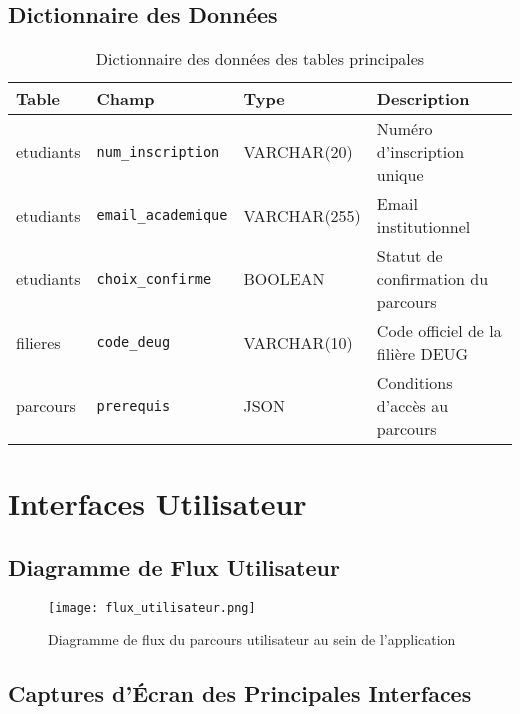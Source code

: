 \documentclass[12pt,a4paper]{report}
\begin{document}
\section{Dictionnaire des Données}
\begin{table}[h!]
    \centering
    \begin{tabular}{llll}
        \toprule
        \textbf{Table} & \textbf{Champ} & \textbf{Type} & \textbf{Description} \\
        \midrule
        etudiants & \texttt{num\_inscription} & VARCHAR(20) & Numéro d'inscription unique \\
        etudiants & \texttt{email\_academique} & VARCHAR(255) & Email institutionnel \\
        etudiants & \texttt{choix\_confirme} & BOOLEAN & Statut de confirmation du parcours \\
        filieres & \texttt{code\_deug} & VARCHAR(10) & Code officiel de la filière DEUG \\
        parcours & \texttt{prerequis} & JSON & Conditions d'accès au parcours \\
        \bottomrule
    \end{tabular}
    \caption{Dictionnaire des données des tables principales}
    \label{tab:dict_donnees}
\end{table}


\chapter{Interfaces Utilisateur}

\section{Diagramme de Flux Utilisateur}
\begin{figure}[H]
    \centering
    \texttt{[image: flux\_utilisateur.png]}
    \caption{Diagramme de flux du parcours utilisateur au sein de l'application}
    \label{fig:flux_utilisateur}
\end{figure}


\section{Captures d'Écran des Principales Interfaces}
\end{document}
